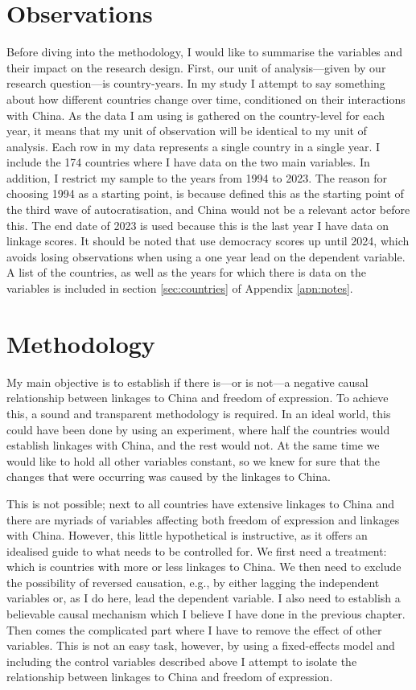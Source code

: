 \section{Observations}
Before diving into the methodology, I would like to summarise the variables and their impact on the research design. First, our unit of analysis---given by our research question---is country-years. In my study I attempt to say something about how different countries change over time,  conditioned on their interactions with China. As the data I am using is gathered on the country-level for each year, it means that my unit of observation will be identical to my unit of analysis. Each row in my data represents a single country in a single year. I include the 174 countries where I have data on the two main variables. In addition, I restrict my sample to the years from 1994 to 2023. The reason for choosing 1994 as a starting point, is because \citet{luhrmann_third_2019} defined this as the starting point of the third wave of autocratisation, and China would not be a relevant actor before this. The end date of 2023 is used because this is the last year I have data on linkage scores. It should be noted that use democracy scores up until 2024,  which avoids losing observations when using a one year lead on the dependent variable. A list of the countries, as well as the years for which there is data on the variables is included in section \ref{sec:countries} of Appendix \ref{apn:notes}. 

\section{Methodology}
My main objective is to establish if there is---or is not---a negative causal relationship between linkages to China and freedom of expression. To achieve this, a sound and transparent methodology is required. In an ideal world, this could have been done by using an experiment, where half the countries would establish linkages with China, and the rest would not. At the same time we would like to hold all other variables constant, so we knew for sure that the changes that were occurring was caused by the linkages to China.

This is not possible; next to all countries have extensive linkages to China and there are myriads of variables affecting both freedom of expression and linkages with China. However, this little hypothetical is instructive, as it offers an idealised guide to what needs to be controlled for. We first need a treatment: which is countries with more or less linkages to China. We then need to exclude the possibility of reversed causation, e.g., by either lagging the independent variables or, as I do here, lead the dependent variable. I also need to establish a believable causal mechanism which I believe I have done in the previous chapter. Then comes the complicated part where I have to remove the effect of other variables. This is not an easy task, however, by using a fixed-effects model and including the control variables described above I attempt to isolate the relationship between linkages to China and freedom of expression.

